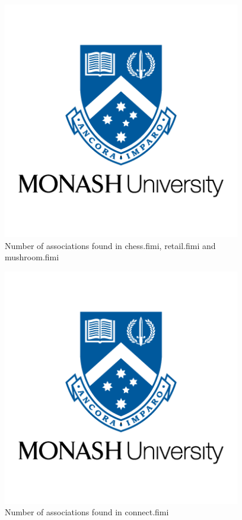\documentclass[10pt,a4paper]{article}
\begin{document}
\begin{figure}[h!]
\begin{center}
  \includegraphics[width=28em]{monash-university-logo.png}
\end{center}
  \caption{Number of associations found in chess.fimi, retail.fimi and mushroom.fimi}
  \label{fig:SSPresults1}
\end{figure}

\vspace{2cm}

\begin{figure}[h!]
\begin{center}
  \includegraphics[width=28em]{monash-university-logo.png}
\end{center}
  \caption{Number of associations found in connect.fimi}
  \label{fig:SSPresults1}
\end{figure}
\end{document}
